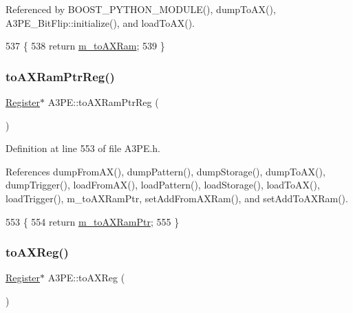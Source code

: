 Referenced by B\+O\+O\+S\+T\+\_\+\+P\+Y\+T\+H\+O\+N\+\_\+\+M\+O\+D\+U\+L\+E(), dump\+To\+A\+X(), A3\+P\+E\+\_\+\+Bit\+Flip\+::initialize(), and load\+To\+A\+X().


\begin{DoxyCode}
537                 \{
538     \textcolor{keywordflow}{return} \hyperlink{classA3PE_ae586a3d2fd21556e84e1af656e3430b5}{m\_toAXRam};
539   \}
\end{DoxyCode}
\mbox{\label{classA3PE_af6e9e980e871fcf0e1b35e1b4ae95ebe}} 
\subsubsection{\texorpdfstring{to\+A\+X\+Ram\+Ptr\+Reg()}{toAXRamPtrReg()}}
{\footnotesize\ttfamily \hyperlink{classRegister}{Register}$\ast$ A3\+P\+E\+::to\+A\+X\+Ram\+Ptr\+Reg (\begin{DoxyParamCaption}{ }\end{DoxyParamCaption})\hspace{0.3cm}{\ttfamily [inline]}}



Definition at line 553 of file A3\+P\+E.\+h.



References dump\+From\+A\+X(), dump\+Pattern(), dump\+Storage(), dump\+To\+A\+X(), dump\+Trigger(), load\+From\+A\+X(), load\+Pattern(), load\+Storage(), load\+To\+A\+X(), load\+Trigger(), m\+\_\+to\+A\+X\+Ram\+Ptr, set\+Add\+From\+A\+X\+Ram(), and set\+Add\+To\+A\+X\+Ram().


\begin{DoxyCode}
553                            \{
554     \textcolor{keywordflow}{return} \hyperlink{classA3PE_aae1b8b2e96bba94535bd4de766bd7e65}{m\_toAXRamPtr};
555   \}
\end{DoxyCode}
\mbox{\label{classA3PE_a43b0006fafa3aeae353abb2ac30e872c}} 
\subsubsection{\texorpdfstring{to\+A\+X\+Reg()}{toAXReg()}}
{\footnotesize\ttfamily \hyperlink{classRegister}{Register}$\ast$ A3\+P\+E\+::to\+A\+X\+Reg (\begin{DoxyParamCaption}{ }\end{DoxyParamCaption})\hspace{0.3cm}{\ttfamily [inline]}}



